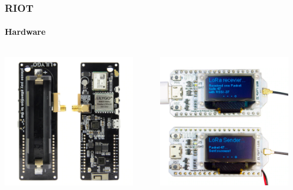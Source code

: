 \begin{frame}
\frametitle{RIOT}
\framesubtitle{Hardware}
\begin{columns}
  \begin{column}{0.35\textwidth}
  \includegraphics[width=0.9\textwidth]{presentation.tex/fig/loramote1.jpg}
  \end{column}
  \begin{column}{0.35\textwidth}
  \includegraphics[width=0.9\textwidth]{presentation.tex/fig/loramote2.jpg}

\end{column}
\end{columns}
\end{frame}
